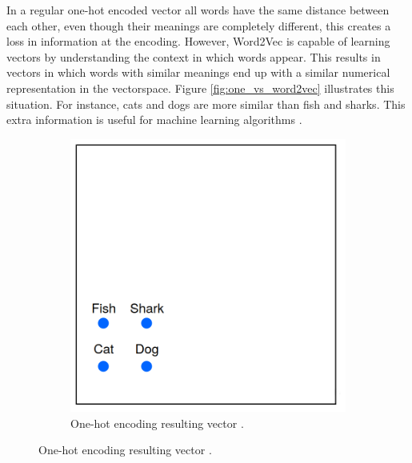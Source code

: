         


        In a regular one-hot encoded vector all words have the same distance between each other, even though their meanings are completely different, this creates a loss in information at the encoding.  However, Word2Vec is capable of learning vectors by understanding the context in which words appear. This results in vectors in which words with similar meanings end up with a similar numerical representation in the vectorspace. Figure \ref{fig:one_vs_word2vec} illustrates this situation. For instance, cats and dogs are more similar than fish and sharks. This extra information is useful for machine learning algorithms \cite{word2vec_explained}.	


        \begin{figure}[H]
            \centering
            \captionsetup{justification=centering}
          
            \begin{subfigure}{0.32\textwidth}
            \includegraphics[width=\textwidth]{Sections/3StateOfTheArt/3_images/one_hot_ex.png} 
            \caption[One-hot encoding resulting vector.]{One-hot encoding resulting vector \cite{word2vec_explained}. }
          

\end{subfigure}
\end{figure}
